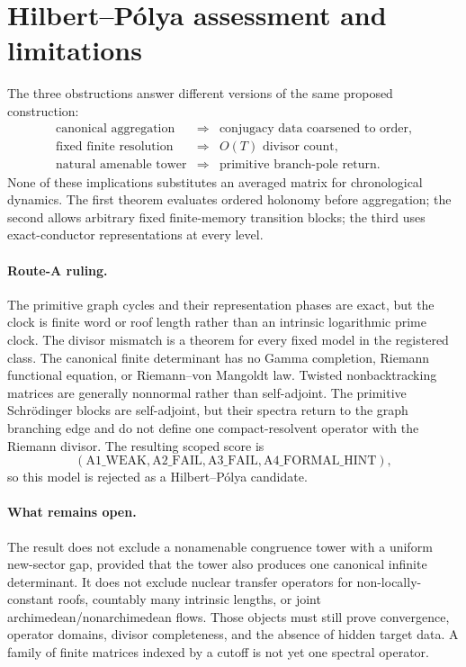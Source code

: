 \section{Hilbert--Pólya assessment and limitations}
\label{sec:assessment}

The three obstructions answer different versions of the same proposed
construction:
\[
\begin{array}{ccl}
\text{canonical aggregation}
&\Longrightarrow&
\text{conjugacy data coarsened to order},\\[1mm]
\text{fixed finite resolution}
&\Longrightarrow&
O(T)\text{ divisor count},\\[1mm]
\text{natural amenable tower}
&\Longrightarrow&
\text{primitive branch-pole return}.
\end{array}
\]
None of these implications substitutes an averaged matrix for chronological
dynamics. The first theorem evaluates ordered holonomy before aggregation;
the second allows arbitrary fixed finite-memory transition blocks; the third
uses exact-conductor representations at every level.

\paragraph{Route-A ruling.}
The primitive graph cycles and their representation phases are exact, but the
clock is finite word or roof length rather than an intrinsic logarithmic
prime clock. The divisor mismatch is a theorem for every fixed model in the
registered class. The canonical finite determinant has no Gamma completion,
Riemann functional equation, or Riemann--von Mangoldt law. Twisted
nonbacktracking matrices are generally nonnormal rather than self-adjoint.
The primitive Schrödinger blocks are self-adjoint, but their spectra return to
the graph branching edge and do not define one compact-resolvent operator
with the Riemann divisor. The resulting scoped score is
\[
(\mathrm{A1\_WEAK},\mathrm{A2\_FAIL},
\mathrm{A3\_FAIL},\mathrm{A4\_FORMAL\_HINT}),
\]
so this model is rejected as a Hilbert--Pólya candidate.

\paragraph{What remains open.}
The result does not exclude a nonamenable congruence tower with a uniform
new-sector gap, provided that the tower also produces one canonical infinite
determinant. It does not exclude nuclear transfer operators for
non-locally-constant roofs, countably many intrinsic lengths, or joint
archimedean/nonarchimedean flows. Those objects must still prove convergence,
operator domains, divisor completeness, and the absence of hidden target
data. A family of finite matrices indexed by a cutoff is not yet one spectral
operator.

